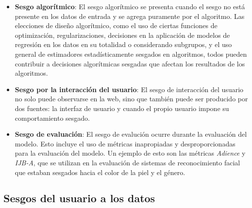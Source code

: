     \begin{itemize}
        \item \textbf{Sesgo algor\'itmico}: El sesgo algor\'itmico se presenta cuando el sesgo no est\'a presente en los datos de entrada
        y se agrega puramente por el algoritmo. Las elecciones de dise\~no algor\'itmico, como el uso de ciertas funciones de optimizaci\'on, 
        regularizaciones, decisiones en la aplicaci\'on de modelos de regresi\'on en los datos en su totalidad o considerando subgrupos, y el uso
        general de estimadores estad\'isticamente sesgados en algoritmos, todos pueden contribuir a decisiones algor\'itmicas sesgadas que 
        afectan los resultados de los algoritmos. 
        
        \item \textbf{Sesgo por la interacci\'on del usuario}: El sesgo de interacci\'on del usuario no solo puede observarse en la web, sino que 
        tambi\'en puede ser producido por dos fuentes: la interfaz de usuario y cuando el propio usuario impone su comportamiento sesgado.
        
        \item \textbf{Sesgo de evaluaci\'on}: El sesgo de evaluci\'on ocurre durante la evaluaci\'on del modelo. Esto incluye el uso de m\'etricas
        inapropiadas y desproporcionadas para la evaluaci\'on del modelo. Un ejemplo de esto son las m\'etricas \textit{Adience} y \textit{IJB-A}, 
        que se utilizan en la evaluaci\'on de sistemas de reconocimiento facial que estaban sesgados hacia el color de la piel y el g\'enero.
    \end{itemize}
    
    \subsection{Sesgos del usuario a los datos}

